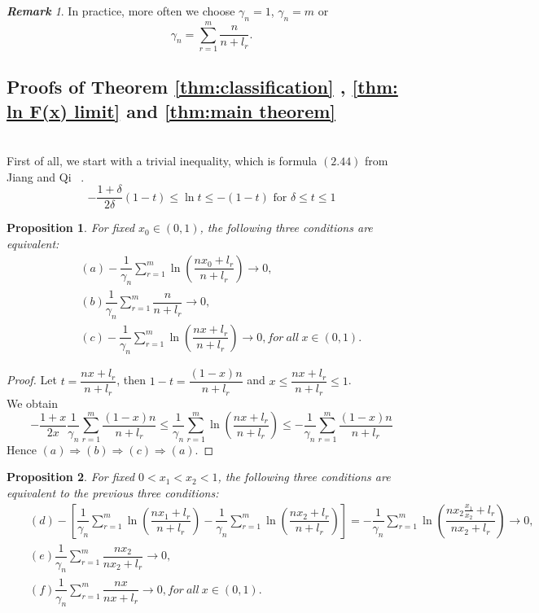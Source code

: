 \documentclass[12pt]{article}
\theoremstyle{plain}
\newtheorem{prop}{Proposition}[section]
\theoremstyle{definition}
\theoremstyle{remark}
\newtheorem{rem}{\textbf{Remark}}
\begin{document}
\begin{rem}
    In practice, more often we choose $\gamma_{n}=1$,   $\gamma_{n}=m$ or
    \begin{equation*}
    \gamma_{n}=\sum_{r=1}^{m} \frac{n}{n+l_{r}}.
    \end{equation*}
\end{rem}


\subsection{Proofs of Theorem \ref{thm:classification} , \ref{thm: ln F(x) limit} and \ref{thm:main theorem}}
\ \\
    First of all, we start with a trivial inequality, which is formula $(2.44)$ from Jiang and Qi ~\cite{JiangQi2019}.
    \begin{equation} \label{inequality}
    -\frac{1+\delta}{2 \delta}(1-t) \leq \ln t \leq-(1-t) \text { for } \delta \leq t \leq 1
    \end{equation}
\begin{prop}
    For fixed $x_0\in (0,1)$,
the following three conditions are equivalent:
\begin{eqnarray*}
&&(a) -\dfrac{1}{\gamma_{n}}\sum_{r=1}^{m}\ln(\dfrac{nx_0+l_r}{n+l_r})\to 0,\\
&&(b) \dfrac{1}{\gamma_{n}}\sum_{r=1}^{m}\dfrac{n}{n+l_r}\to 0,\\
&&(c)-\dfrac{1}{\gamma_{n}}\sum_{r=1}^{m}\ln(\dfrac{nx+l_r}{n+l_r})\to 0, for\ all\ x\in (0,1).
\end{eqnarray*}
\end{prop}
\begin{proof}
Let $t=\dfrac{nx+l_r}{n+l_r}$, then $1-t=\dfrac{(1-x)n}{n+l_r}$ and $x\leq \dfrac{nx+l_r}{n+l_r}\leq 1$.\\
We obtain
\begin{equation}\label{ineq}
-\frac{1+x}{2 x}\dfrac{1}{\gamma_{n}}\sum_{r=1}^{m}\dfrac{(1-x)n}{n+l_r} \leq  \dfrac{1}{\gamma_{n}}\sum_{r=1}^{m}\ln(\dfrac{nx+l_r}{n+l_r}) \leq-\dfrac{1}{\gamma_{n}}\sum_{r=1}^{m}\dfrac{(1-x)n}{n+l_r}
\end{equation}
Hence $(a)\Rightarrow (b)\Rightarrow (c)\Rightarrow (a)$.
\end{proof}
\begin{prop}
    For fixed $0<x_1<x_2<1$,
    the following three conditions are equivalent to the previous three conditions:
\begin{eqnarray*}
&&(d) -[\dfrac{1}{\gamma_{n}}\sum_{r=1}^{m}\ln(\dfrac{nx_1+l_r}{n+l_r})-\dfrac{1}{\gamma_{n}}\sum_{r=1}^{m}\ln(\dfrac{nx_2+l_r}{n+l_r})]=-\dfrac{1}{\gamma_{n}}\sum_{r=1}^{m}\ln(\dfrac{nx_2\frac{x_1}{x_2}+l_r}{nx_2+l_r})\to 0,\\
&&(e) \dfrac{1}{\gamma_{n}}\sum_{r=1}^{m}\dfrac{nx_2}{nx_2+l_r}\to 0,\\
&&(f) \dfrac{1}{\gamma_{n}}\sum_{r=1}^{m}\dfrac{nx}{nx+l_r}\to 0, for\ all\ x\in (0,1).
\end{eqnarray*}
\end{prop}
\end{document}
